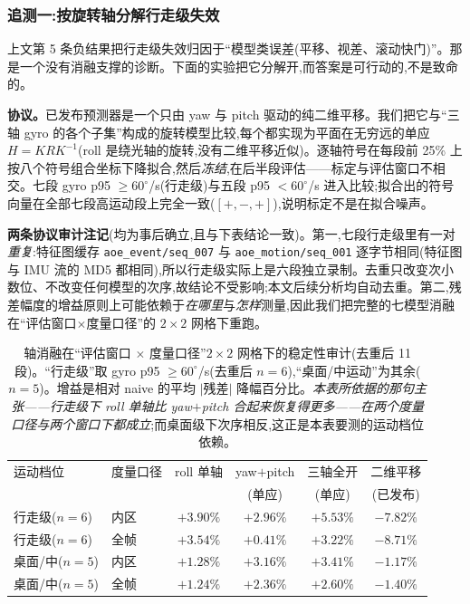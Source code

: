 \documentclass[UTF8,12pt,a4paper]{ctexart}
\begin{document}
\subsubsection{追测一:按旋转轴分解行走级失效}
\label{sec:axiabl}

上文第 5 条负结果把行走级失效归因于``模型类误差(平移、视差、滚动快门)''。那是一个没有消融支撑的诊断。下面的实验把它分解开,而答案是可行动的,不是致命的。

\textbf{协议。}已发布预测器是一个只由 yaw 与 pitch 驱动的纯二维平移。我们把它与``三轴 gyro 的各个子集''构成的旋转模型比较,每个都实现为平面在无穷远的单应 $H = K R K^{-1}$(roll 是绕光轴的旋转,没有二维平移近似)。逐轴符号在每段前 25\% 上按八个符号组合坐标下降拟合,然后\emph{冻结},在后半段评估——标定与评估窗口不相交。七段 gyro p95 $\ge 60^\circ$/s(行走级)与五段 p95 $<60^\circ$/s 进入比较;拟合出的符号向量在全部七段高运动段上完全一致($[+,-,+]$),说明标定不是在拟合噪声。

\textbf{两条协议审计注记}(均为事后确立,且与下表结论一致)。第一,七段行走级里有一对\emph{重复}:特征图缓存 \texttt{aoe\_event/seq\_007} 与 \texttt{aoe\_motion/seq\_001} 逐字节相同(特征图与 IMU 流的 MD5 都相同),所以行走级实际上是六段独立录制。去重只改变次小数位、不改变任何模型的次序,故结论不受影响;本文后续分析均自动去重。第二,残差幅度的增益原则上可能依赖于\emph{在哪里}与\emph{怎样}测量,因此我们把完整的七模型消融在``评估窗口$\times$度量口径''的 $2\times2$ 网格下重跑。

\begin{table}[htbp]
  \centering
  \small
  \caption{轴消融在``评估窗口 $\times$ 度量口径''$2\times2$ 网格下的稳定性审计(去重后 11 段)。``行走级''取 gyro p95 $\ge 60^\circ$/s(去重后 $n{=}6$),``桌面/中运动''为其余($n{=}5$)。增益是相对 naive 的平均 $|$残差$|$ 降幅百分比。\emph{本表所依据的那句主张——行走级下 roll 单轴比 yaw$+$pitch 合起来恢复得更多——在两个度量口径与两个窗口下都成立};而桌面级下次序相反,这正是本表要测的运动档位依赖。}
  \label{tab:axis-stability}
  \begin{tabular}{llcccc}
    \toprule
    运动档位 & 度量口径 & roll 单轴 & yaw$+$pitch & 三轴全开 & 二维平移 \\
     & & & (单应) & (单应) & (已发布) \\
    \midrule
    行走级($n{=}6$) & 内区 & $\mathbf{+3.90\%}$ & $+2.96\%$ & $\mathbf{+5.53\%}$ & $-7.82\%$ \\
    行走级($n{=}6$) & 全帧 & $\mathbf{+3.54\%}$ & $+0.41\%$ & $+3.22\%$ & $-8.71\%$ \\
    \midrule
    桌面/中($n{=}5$) & 内区 & $+1.28\%$ & $\mathbf{+3.16\%}$ & $+3.41\%$ & $-1.17\%$ \\
    桌面/中($n{=}5$) & 全帧 & $+1.24\%$ & $\mathbf{+2.36\%}$ & $+2.60\%$ & $-1.40\%$ \\
    \bottomrule
  \end{tabular}
\end{table}
\end{document}
